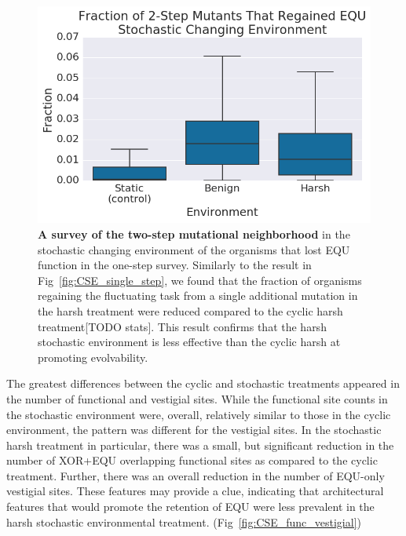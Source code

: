 \documentclass[PhD]{msu-thesis}
\begin{document}
	\begin{figure}[!h] %
	\includegraphics[trim={0.2cm 0 0.4cm 0.25cm},clip,width=0.75\columnwidth]{figures/CE/CSE_frac_2step__box.png}
	\caption{\textbf{A survey of the two-step mutational neighborhood} in the stochastic changing environment of the organisms that lost EQU function in the one-step survey. Similarly to the result in Fig~\ref{fig:CSE_single_step}, we found that the fraction of organisms regaining the fluctuating task from a single additional mutation in the harsh treatment were reduced compared to the cyclic harsh treatment[TODO stats]. This result confirms that the harsh stochastic environment is less effective than the cyclic harsh at promoting evolvability.
	}\label{fig:CSE_two_step}
	\end{figure}

The greatest differences between the cyclic and stochastic treatments appeared in the number of functional and vestigial sites. While the functional site counts in the stochastic environment were, overall, relatively similar to those in the cyclic environment, the pattern was different for the vestigial sites. In the stochastic harsh treatment in particular, there was a small, but significant reduction in the number of XOR+EQU overlapping functional sites as compared to the cyclic treatment. Further, there was an overall reduction in the number of EQU-only vestigial sites. These features may provide a clue, indicating that architectural features that would promote the retention of EQU were less prevalent in the harsh stochastic environmental treatment. (Fig~\ref{fig:CSE_func_vestigial}) 
\end{document}
